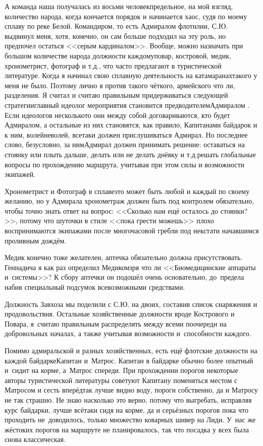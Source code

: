 А команда наша получалась из восьми человек\mdash предельное, на мой взгляд, количество народа, когда кончается порядок и начинается хаос, судя по моему сплаву по реке Белой. Командиром, то есть Адмиралом флотилии, С.Ю. выдвинул меня, хотя, конечно, он сам больше подходил на эту роль, но предпочел остаться <<серым кардиналом>>. Вообще, можно назначать при большом количестве народа должности каждому\mdash повар, костровой, медик, хронометрист, фотограф и т.д., что часто предлагают в туристической литературе. Когда я начинал свою сплавную деятельность на катамаранах\mdash такого у меня не было. Поэтому лично я против такого чёткого, армейского что ли, разделения. Я считал и считаю правильным придерживаться следующей стратегии\mdash главный идеолог мероприятия становится предводителем\mdash Адмиралом \cite{Квадригин}. Если идеологов несколько\mdash то они между собой договариваются, кто будет Адмиралом, а остальные из них становятся, как правило, Капитанами байдарок и к ним, волей\sdash неволей, все\sdash таки должен прислушиваться Адмирал. Но последнее слово, безусловно, за ним\mdash Адмирал должен принимать решение: оставаться на стоянку или плыть дальше, делать или не делать днёвку и т.д.\mdash решать глобальные вопросы по прохождению маршрута, учитывая при этом силы и возможности экипажей.

Хронометрист и Фотограф в сплаве\mdash это может быть любой и каждый по своему желанию, но у Адмирала хронометраж должен быть под контролем обязательно, чтобы точно знать ответ на вопрос: <<Сколько нам ещё осталось до стоянки?>>, потому что шуточки в стиле <<пока грести можешь>> плохо воспринимаются экипажами после многочасовой гребли под некстати начавшимся проливным дождём. 

Медик конечно тоже желателен, аптечка обязательно должна присутствовать. Геннадича я как раз определил Медиком\mdash зря что ли <<Биомедицинские аппараты и~системы>>? К сбору аптечки он подошёл очень основательно, до~предела набив специальный подсумок всевозможными средствами.

Должность Завхоза мы поделили с С.Ю. на двоих, составив список снаряжения и продовольствия. Остальные хозяйственные должности вроде Кострового и Повара, я~считаю правильным распределять между всеми по\sdash очереди на добровольных началах, а также учитывая возможности и~способности каждого. 

Помимо адмиральской и разных хозяйственных, есть ещё флотские должности на каждой байдарке\mdash Капитан и~Матрос. Капитан в байдарке обычно более опытный и~сидит на корме, а~Матрос спереди. При прохождении порогов некоторые авторы туристической литературы советуют Капитану поменяться местом с Матросом и сесть вперёд\mdash так лучше видно воду, пороги собственно, да и Матросу не так страшно. Не знаю насколько это верно, потому что выгребать, исправляя курс байдарки, лучше всё\sdash таки сидя на корме, да и серьёзных порогов пока что проходить не~доводилось, только множество коварных шивер на Лиди. У~нас же жёстоких порогов на маршруте не планировалось, так что посадка у всех была снова классическая. 

